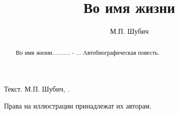 ﻿%
\title{\huge\bf Во имя жизни}										%
\author{\LARGE М.П. Шубич}											%

\maketitle																			%


\abstractstyle{\footnotesize}
{\item Текст. М.П. Шубич, \theyear.\\ 
\item Права на иллюстрации принадлежат их авторам.}

\begin {abstract}
	 {Во имя жизни........... - ...}
	Автобиографическая повесть.
\end{abstract}


\setcounter{page}{3}										%